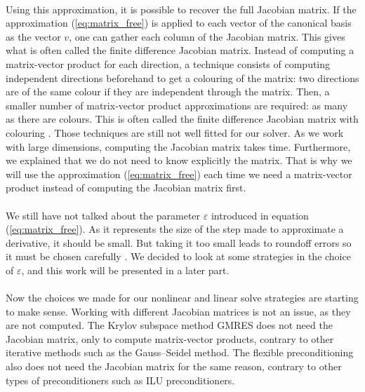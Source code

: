       \paragraph{}
      Using this approximation, it is possible to recover the full Jacobian matrix.
      If the approximation (\ref{eq:matrix_free}) is applied to each vector of the canonical basis as the vector $v$, one can gather each column of the Jacobian matrix.
      This gives what is often called the finite difference Jacobian matrix.
      Instead of computing a matrix-vector product for each direction, a technique consists of computing independent directions beforehand to get a colouring of the matrix: two directions are of the same colour if they are independent through the matrix.
      Then, a smaller number of matrix-vector product approximations are required: as many as there are colours.
      This is often called the finite difference Jacobian matrix with colouring \cite{GebremedhinMannePothen2005}.
      Those techniques are still not well fitted for our solver.
      As we work with large dimensions, computing the Jacobian matrix takes time.
      Furthermore, we explained that we do not need to know explicitly the matrix.
      That is why we will use the approximation (\ref{eq:matrix_free}) each time we need a matrix-vector product instead of computing the Jacobian matrix first.

      \paragraph{}
      We still have not talked about the parameter $\varepsilon$ introduced in equation (\ref{eq:matrix_free}).
      As it represents the size of the step made to approximate a derivative, it should be small.
      But taking it too small leads to roundoff errors so it must be chosen carefully \cite{KnollKeyes2004}.
      We decided to look at some strategies in the choice of $\varepsilon$, and this work will be presented in a later part.

      \paragraph{}
      Now the choices we made for our nonlinear and linear solve strategies are starting to make sense.
      Working with different Jacobian matrices is not an issue, as they are not computed.
      The Krylov subspace method GMRES does not need the Jacobian matrix, only to compute matrix-vector products, contrary to other iterative methods such as the Gauss--Seidel method.
      The flexible preconditioning also does not need the Jacobian matrix for the same reason, contrary to other types of preconditioners such as ILU preconditioners.

